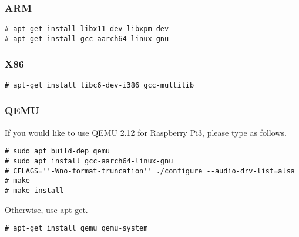 \subsubsection{ARM}


\noindent
\begin{Sbox}
\begin{minipage}[t]{0.975\linewidth}
\begin{verbatim}
# apt-get install libx11-dev libxpm-dev
# apt-get install gcc-aarch64-linux-gnu
\end{verbatim}
\end{minipage}
\end{Sbox}
\fbox{\TheSbox}




\subsubsection{X86}

\noindent
\begin{Sbox}
\begin{minipage}[t]{0.975\linewidth}
\begin{verbatim}
# apt-get install libc6-dev-i386 gcc-multilib
\end{verbatim}
\end{minipage}
\end{Sbox}
\fbox{\TheSbox}


\subsubsection*{QEMU}


If you would like to use QEMU 2.12 for Raspberry Pi3, please type as follows.

\noindent
\begin{Sbox}
\begin{minipage}[t]{0.975\linewidth}
\begin{verbatim}
# sudo apt build-dep qemu
# sudo apt install gcc-aarch64-linux-gnu
# CFLAGS=''-Wno-format-truncation'' ./configure --audio-drv-list=alsa
# make
# make install
\end{verbatim}
\end{minipage}
\end{Sbox}
\fbox{\TheSbox}

Otherwise, use apt-get.

\noindent
\begin{Sbox}
\begin{minipage}[t]{0.975\linewidth}
\begin{verbatim}
# apt-get install qemu qemu-system
\end{verbatim}
\end{minipage}
\end{Sbox}
\fbox{\TheSbox}


